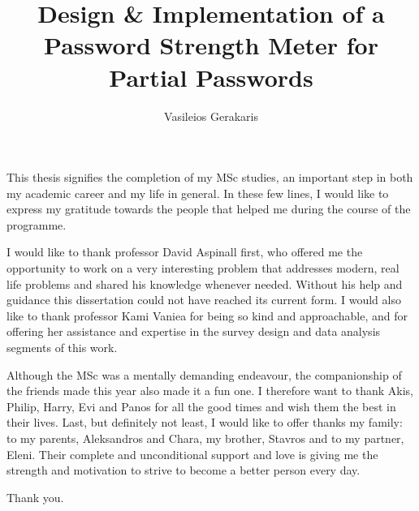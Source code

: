 \documentclass[msc, logo, parskip, abbrevs, notimes, twoside]{infthesis}  %
\title{Design \& Implementation of a Password Strength Meter for Partial Passwords}
\author{Vasileios Gerakaris}
\begin{document}
\begin{preliminary}

  \maketitle

  \begin{acknowledgements}
    This thesis signifies the completion of my MSc studies, an important step in both my academic career and my life in general. In these few lines, I would like to express my gratitude towards the people that helped me during the course of the programme.

    I would like to thank professor David Aspinall first, who offered me the opportunity to work on a very interesting problem that addresses modern, real life problems and shared his knowledge whenever needed. Without his help and guidance this dissertation could not have reached its current form. I would also like to thank professor Kami Vaniea for being so kind and approachable, and for offering her assistance and expertise in the survey design and data analysis segments of this work.

    Although the MSc was a mentally demanding endeavour, the companionship of the friends made this year also made it a fun one. I therefore want to thank Akis, Philip, Harry, Evi and Panos for all the good times and wish them the best in their lives.
    Last, but definitely not least, I would like to offer thanks my family: to my parents, Aleksandros and Chara, my brother, Stavros and to my partner, Eleni. Their complete and unconditional support and love is giving me the strength and motivation to strive to become a better person every day.

    Thank you.

  \end{acknowledgements}

  \standarddeclaration


  \tableofcontents

\end{preliminary}






\end{document}

